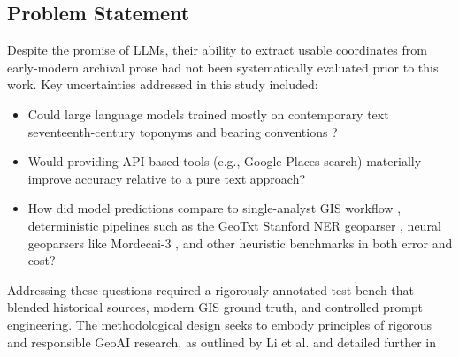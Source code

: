 
\DIFaddend \subsection{Problem Statement}\label{problem-statement}

Despite the promise of LLMs, their ability to extract usable coordinates
from early-modern archival prose had not been systematically evaluated
prior to this work. Key uncertainties addressed in this study included:

\begin{itemize}
\tightlist
\item
  Could large language models trained mostly on contemporary text
  \DIFdelbegin {}\DIFdelend \DIFaddbegin {}\DIFaddend seventeenth-century toponyms and bearing conventions
  \DIFaddbegin {}\DIFaddend ?
\item
  Would providing API-based tools (e.g., Google Places search)
  materially improve accuracy relative to a pure text approach?
\item
  How did model predictions compare to single-analyst GIS workflow
  \citep{Bashorun2025_gis}, deterministic pipelines such as the GeoTxt
  Stanford NER geoparser \citep{karimzadeh2019geotxt}, neural geoparsers
  like Mordecai-3 \citep{halterman2023mordecai}, and other heuristic
  benchmarks in both error and cost?
\end{itemize}

Addressing these questions required a rigorously annotated test bench
that blended historical sources, modern GIS ground truth, and controlled
prompt engineering. The methodological design seeks to embody principles
of rigorous and responsible GeoAI research, as outlined by Li et
al.\DIFaddbegin \DIFadd{~}\DIFaddend \citep{Li2024_geoai} and detailed further in \DIFdelbegin {}\DIFdelend \DIFaddbegin {}\DIFdelbegin {}\DIFdelend \DIFaddbegin {}\DIFaddend 

